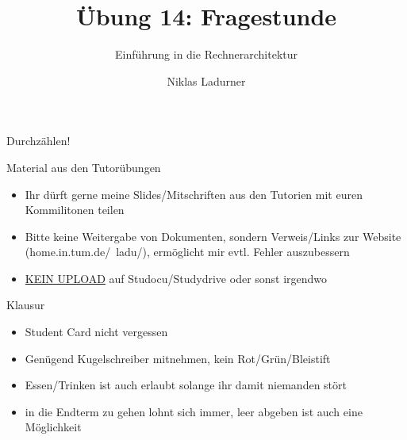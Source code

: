 \documentclass[
  german,            %
  aspectratio=169,    %
]{tumbeamer}
\title{Übung 14: Fragestunde}
\subtitle{Einführung in die Rechnerarchitektur}
\author{Niklas Ladurner}
\institute{\theChairName\\\theDepartmentName\\\theUniversityName}
\date{\DTMdisplaydate{2024}{2}{2}{-1}}
\begin{document}
\maketitle

\begin{frame}[c]{}{}
  \begin{center}
    \LARGE  Durchzählen!
  \end{center}
\end{frame}

\begin{frame}[fragile, c]{Material aus den Tutorübungen}{}
  \begin{itemize}
    \item Ihr dürft gerne meine Slides/Mitschriften aus den Tutorien mit 
    euren Kommilitonen teilen
    \item Bitte keine Weitergabe von Dokumenten, sondern Verweis/Links zur Website (home.in.tum.de/\string~ladu/), 
    ermöglicht mir evtl. Fehler auszubessern
    \item \underline{KEIN UPLOAD} auf Studocu/Studydrive oder sonst irgendwo
  \end{itemize}
\end{frame}

\begin{frame}[fragile, c]{Klausur}{}
\begin{itemize}
  \item Student Card nicht vergessen
  \item Genügend Kugelschreiber mitnehmen, kein Rot/Grün/Bleistift
  \item Essen/Trinken ist auch erlaubt solange ihr damit niemanden stört
  \item in die Endterm zu gehen lohnt sich immer, leer abgeben ist auch eine Möglichkeit
\end{itemize}
\end{frame}
\end{document}
